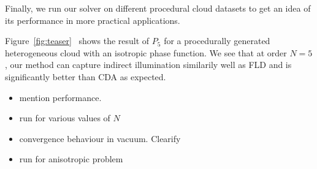 Finally, we run our solver on different procedural cloud datasets to get an idea of its performance in more practical applications.

Figure~\ref{fig:teaser}~ shows the result of $P_5$ for a procedurally generated heterogeneous cloud with an isotropic phase function. We see that at order $N=5$, our method can capture indirect illumination similarily well as FLD and is significantly better than CDA as expected.

\begin{itemize}
	\item mention performance.
	\item run for various values of $N$
	\item convergence behaviour in vacuum. Clearify
	\item run for anisotropic problem
\end{itemize}


